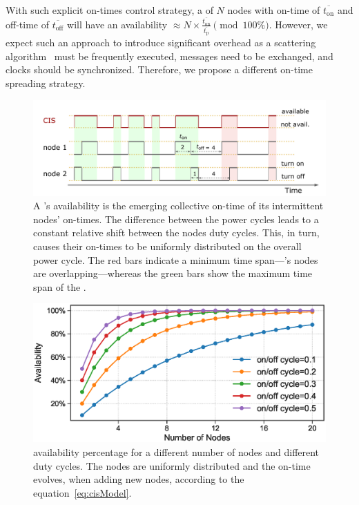 With such explicit on-times control strategy, a \sys of $N$ nodes with on-time of $\overline{t_\text{on}}$ and off-time of $\overline{t_\text{off}}$ will have an availability $\approx N\times \frac{\overline{t_\text{on}}}{\overline{t_\text{p}}} \pmod{100\%}$. However, we expect such an approach to introduce significant overhead as a scattering algorithm~\cite{giusti2007decentralized} must be frequently executed, messages need to be exchanged, and clocks should be synchronized. Therefore, we propose a different on-time spreading strategy.  
%
\begin{figure}[t]
		\centering
		\includegraphics[width=\columnwidth]{figures/cisOntime}
		\caption{A \fullsys's availability is the emerging collective on-time of its intermittent nodes' on-times. The difference between the power cycles leads to a constant relative shift between the nodes duty cycles. This, in turn, causes their on-times to be uniformly distributed on the overall power cycle. The red bars indicate a minimum \sys time span---\sys's nodes are overlapping---whereas the green bars show the maximum time span of the \sys.}
		\label{fig:cisOntime}
\end{figure} 
%
\begin{figure}
		\centering
		\includegraphics[width=\columnwidth]{figures/cisModel}
		\caption{\fullsys availability percentage for a different number of nodes and different duty cycles. The nodes are uniformly distributed and the \sys on-time evolves, when adding new nodes, according to the equation~\ref{eq:cisModel}.}
		\label{fig:cisModel}
\end{figure} 
%
